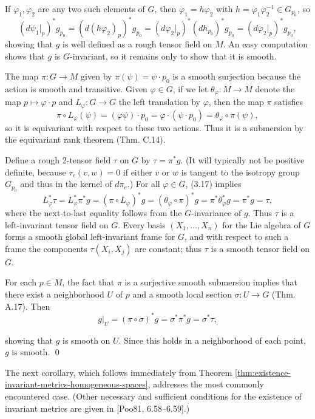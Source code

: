 If $\varphi_1, \varphi_2$ are any two such elements of $G$, then $\varphi_1 = h\varphi_2$ with $h = \varphi_1\varphi_2^{-1} \in G_{p_0}$, so
\[
(d\psi_1|_p)^* g_{p_0} = (d(h\varphi_2)_p)^* g_{p_0} = (d\varphi_2|_p)^* (dh_{p_0})^* g_{p_0} = (d\varphi_2|_p)^* g_{p_0},
\]
showing that $g$ is well defined as a rough tensor field on $M$. An easy computation shows that $g$ is $G$-invariant, so it remains only to show that it is smooth.

The map $\pi: G \to M$ given by $\pi(\psi) = \psi \cdot p_0$ is a smooth surjection because the action is smooth and transitive. Given $\varphi \in G$, if we let $\theta_\varphi: M \to M$ denote the map $p \mapsto \varphi \cdot p$ and $L_\varphi: G \to G$ the left translation by $\varphi$, then the map $\pi$ satisfies
\begin{equation}
\pi \circ L_\varphi(\psi) = (\varphi\psi) \cdot p_0 = \varphi \cdot (\psi \cdot p_0) = \theta_\varphi \circ \pi(\psi),
\tag{3.17}
\end{equation}
so it is equivariant with respect to these two actions. Thus it is a submersion by the equivariant rank theorem (Thm. C.14).

Define a rough 2-tensor field $\tau$ on $G$ by $\tau = \pi^* g$. (It will typically not be positive definite, because $\tau_e(v, w) = 0$ if either $v$ or $w$ is tangent to the isotropy group $G_{p_0}$ and thus in the kernel of $d\pi_e$.) For all $\varphi \in G$, (3.17) implies
\[
L_\varphi^* \tau = L_\varphi^* \pi^* g = (\pi \circ L_\varphi)^* g = (\theta_\varphi \circ \pi)^* g = \pi^* \theta_\varphi^* g = \pi^* g = \tau,
\]
where the next-to-last equality follows from the $G$-invariance of $g$. Thus $\tau$ is a left-invariant tensor field on $G$. Every basis $(X_1, \ldots, X_n)$ for the Lie algebra of $G$ forms a smooth global left-invariant frame for $G$, and with respect to such a frame the components $\tau(X_i, X_j)$ are constant; thus $\tau$ is a smooth tensor field on $G$.

For each $p \in M$, the fact that $\pi$ is a surjective smooth submersion implies that there exist a neighborhood $U$ of $p$ and a smooth local section $\sigma: U \to G$ (Thm. A.17). Then
\[
g|_U = (\pi \circ \sigma)^* g = \sigma^* \pi^* g = \sigma^* \tau,
\]

showing that $g$ is smooth on $U$. Since this holds in a neighborhood of each point, $g$ is smooth. \qed

\noindent
The next corollary, which follows immediately from Theorem \ref{thm:existence-invariant-metrics-homogeneous-spaces}, addresses
the most commonly encountered case. (Other necessary and sufficient conditions
for the existence of invariant metrics are given in [Poo81, 6.58--6.59].)

